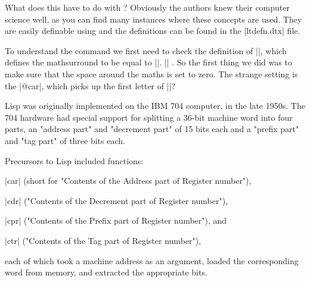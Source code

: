 What does this have to do with \latex? Obviously the \latex authors knew their computer science well, as you can find many instances where these concepts are used. They are easily definable using \tex and the definitions can be found in the |ltdefn.dtx| file.






\begin{teX}
\makeatletter
 \def\LaTeXe{%
   \mbox{\m@th%
    \if b\expandafter\@car\f@series\@nil\boldmath\fi
     \LaTeX\kern.15em2$_{\textstyle\varepsilon}$}}
\makeatother
\end{teX}

\scalebox{5}{\LaTeXe}

To understand the command we first need to check the definition of |\m@th|, which defines the mathsurround to be equal to |\z@|. |\def\m@th{\mathsurround\z@}| . So the first thing we did was to make sure that the space around the maths is set to zero. The strange setting is the |@car|, which picks up the first letter of |\boldmath|?

\makeatletter
\def\Latex{%
   \mbox{\m@th%
    \boldmath
     \LaTeX\kern.15em2$_{\textstyle\varepsilon}$}}
\makeatother

\scalebox{5}{\Latex}


Lisp was originally implemented on the IBM 704 computer, in the late 1950s. The 704 hardware had special support for splitting a 36-bit machine word into four parts, an "address part" and "decrement part" of 15 bits each and a "prefix part" and "tag part" of three bits each.

Precursors to Lisp included functions:

\begin{description}
\item{|car|} (short for "Contents of the Address part of Register number"),
\item{|cdr|} ("Contents of the Decrement part of Register number"),
\item{|cpr|} ("Contents of the Prefix part of Register number"), and
\item{|ctr|} ("Contents of the Tag part of Register number"),
\end{description}
each of which took a machine address as an argument, loaded the corresponding word from memory, and extracted the appropriate bits.














